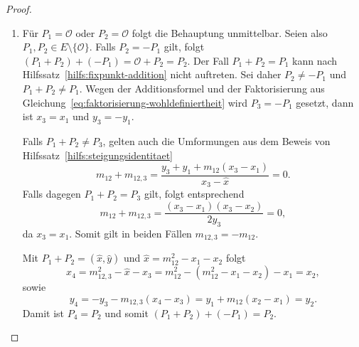 \begin{proof}
\begin{enumerate}[label= (\alph*)]
\[                  x_3=-x_1-x_2+m_{12}^2 \qquad \text{und}\qquad  y_3=-y_1-m_{12}(x_3-x_1)
              \]
              Weiter gilt dann \(-P_1=(x_1,-y_1)\) und \(-P_2=(x_2,-y_2)\). Für $P_1\neq P_2$ gilt wegen $P_2\neq-P_1$ auch $x_1\neq x_2$. Daher folgt
              \[
                  m(-P_1,-P_2)
                  =
                  \frac{-y_2+y_1}{x_2-x_1}
                  =
                  -m_{12}.
              \]
              Für $P_1=P_2$ folgt aus $P_2\neq-P_1$, dass
              $y_1\neq0$ ist. Mit der Tangentenformel erhält man
              \[
                  m(-P_1,-P_1)=\frac{3x_1^2+A}{-2y_1}=-m_{12}.
              \]
              Daher hat die Summe $(-P_1)+(-P_2)$ dieselbe $x$-Koordinate $x_3$ und für die $y$-Koordinate gilt
              \[
                  -(-y_1)-(-m_{12})(x_3-x_1)
                  =
                  y_1+m_{12}(x_3-x_1)
                  =
                  -y_3.
              \]
              Somit folgt
              \[
                  (-P_1)+(-P_2)
                  =
                  (x_3,-y_3)
                  =
                  -(P_1+P_2).
              \]

        \item Für $P_1=\mathcal{O}$ oder $P_2=\mathcal{O}$ folgt die Behauptung unmittelbar. Seien also $P_1,P_2\in E\setminus\{\mathcal{O}\}$. Falls $P_2=-P_1$ gilt, folgt $(P_1+P_2)+(-P_1)=\mathcal{O}+P_2=P_2$. Der Fall $P_1+P_2=P_1$ kann nach Hilfssatz~\ref{hilfs:fixpunkt-addition} nicht auftreten. Sei daher $P_2\neq -P_1$ und $P_1+P_2\neq P_1$. Wegen der Additionsformel und der Faktorisierung aus Gleichung~\eqref{eq:faktorisierung-wohldefiniertheit} wird $P_3=-P_1$ gesetzt, dann ist $x_3=x_1$ und $y_3=-y_1$.

              Falls $P_1+P_2\neq P_3$, gelten auch die Umformungen aus dem Beweis von Hilfssatz~\ref{hilfs:steigungsidentitaet}
              \[
                  m_{12}+m_{12,3}
                  =
                  \frac{y_3+y_1+m_{12}(x_3-x_1)}{x_3-\hat{x}}
                  =0.
              \]
              Falls dagegen $P_1+P_2=P_3$ gilt, folgt entsprechend
              \[
                  m_{12}+m_{12,3}
                  =
                  \frac{(x_3-x_1)(x_3-x_2)}{2y_3}
                  =0,
              \]
              da $x_3=x_1$. Somit gilt in beiden Fällen $m_{12,3}=-m_{12}$.

              Mit $P_1+P_2=(\hat{x},\hat{y})$ und $\hat{x}=m_{12}^2-x_1-x_2$ folgt
              \[
                  x_4=m_{12,3}^2-\hat{x}-x_3
                  =m_{12}^2-(m_{12}^2-x_1-x_2)-x_1=x_2,
              \]
              sowie
              \[
                  y_4=-y_3-m_{12,3}(x_4-x_3)
                  =y_1+m_{12}(x_2-x_1)=y_2.
              \]
              Damit ist $P_4=P_2$ und somit $(P_1+P_2)+(-P_1)=P_2$.


\end{enumerate}
\end{proof}

